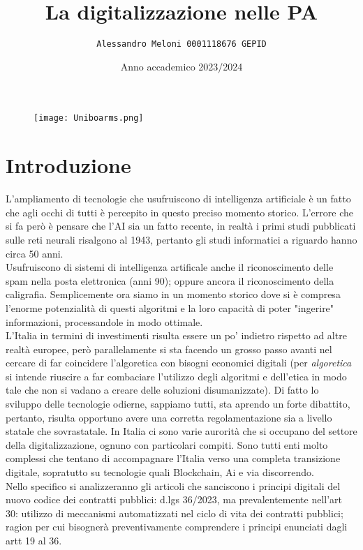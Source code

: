 \documentclass{article}
\title{\huge\textbf{La digitalizzazione nelle PA}}
\author{\texttt{Alessandro Meloni 0001118676 GEPID}}
\date{Anno accademico 2023/2024}
\begin{document}
\begin{figure}
    \centering
    \texttt{[image: Uniboarms.png]}
\end{figure}
\maketitle

\centering \tableofcontents

\newpage\centering
\section{Introduzione}
\begin{justify}
L'ampliamento di tecnologie che usufruiscono di intelligenza artificiale è un fatto che agli occhi di tutti è percepito in questo preciso momento storico. L'errore che si fa però è pensare che l'AI sia un fatto recente, in realtà i primi studi pubblicati sulle reti neurali risalgono al 1943, pertanto gli studi informatici a riguardo hanno circa 50 anni.\citep{mcculloch1943logical}\\ Usufruiscono di sistemi di intelligenza artificale anche il riconoscimento delle spam nella posta elettronica (anni 90); oppure ancora il riconoscimento della caligrafia. Semplicemente ora siamo in un momento storico dove si è compresa l'enorme potenzialità di questi algoritmi e la loro capacità di poter "ingerire" informazioni, processandole in modo ottimale.\\
L'Italia in termini di investimenti risulta essere un po' indietro rispetto ad altre realtà europee, però parallelamente si sta facendo un grosso passo avanti nel cercare di far coincidere l'algoretica con bisogni economici digitali (per \textit{algoretica} si intende riuscire a far combaciare l'utilizzo degli algoritmi e dell'etica in modo tale che non si vadano a creare delle soluzioni disumanizzate).
Di fatto lo sviluppo delle tecnologie odierne, sappiamo tutti, sta aprendo un forte dibattito, pertanto, risulta opportuno avere una corretta regolamentazione sia a livello statale che sovrastatale.
In Italia ci sono varie aurorità che si occupano del settore della digitalizzazione, ognuno con particolari compiti.
Sono tutti enti molto complessi che tentano di accompagnare l'Italia verso una completa transizione digitale, sopratutto su tecnologie quali Blockchain, Ai e via discorrendo.\\
Nello specifico si analizzeranno gli articoli che sanciscono i principi digitali del nuovo codice dei contratti pubblici: d.lgs 36/2023, ma prevalentemente nell'art 30: utilizzo di meccanismi automatizzati nel ciclo di vita dei contratti pubblici; ragion per cui bisognerà preventivamente comprendere i principi enunciati dagli artt 19 al 36.\\

\end{justify}
\end{document}
